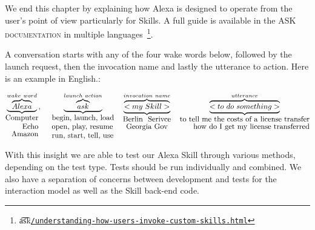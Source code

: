We end this chapter by explaining how Alexa is designed to operate from the user's point of view particularly for Skills. A full guide is available in the \textsc{ASK documentation} in multiple languages~\footnote{\t{a\t{sk}}\href{https://developer.amazon.com/docs/custom-skills/understanding-how-users-invoke-custom-skills.html}{\lstinline|/understanding-how-users-invoke-custom-skills.html|}}.

A conversation starts with any of the four wake words below, followed by the launch request, then the invocation name and lastly the utterance to action. Here is an example in English.:


\[
	\underbrace{\overbrace{Alexa}^{wake \  word}}_{\shortstack[r]{Computer\\Echo\\Amazon}} %
	, \ \ \ \ 
	\underbrace{\overbrace{ask}^{launch \ action}}_{\shortstack[l]{begin, launch, load\\open, play, resume\\run, start, tell, use}}
	\ \ \ 
	\underbrace{\overbrace{<my \ Skill>}^{invocation \ name}}_{\shortstack{Berlin \ Serivce \\ Georgia Gov}}
	\ \ \
	\underbrace{\overbrace{<to \ do \ something>}^{utterance}}_{\shortstack[r]{to tell me the costs of a license transfer\\how do I get my license transferred}}
\]






With this insight we are able to test our Alexa Skill through various methods, depending on the test type. Tests should be run individually and combined. We also have a separation of concerns between development and tests for the interaction model as well as the Skill back-end code.



